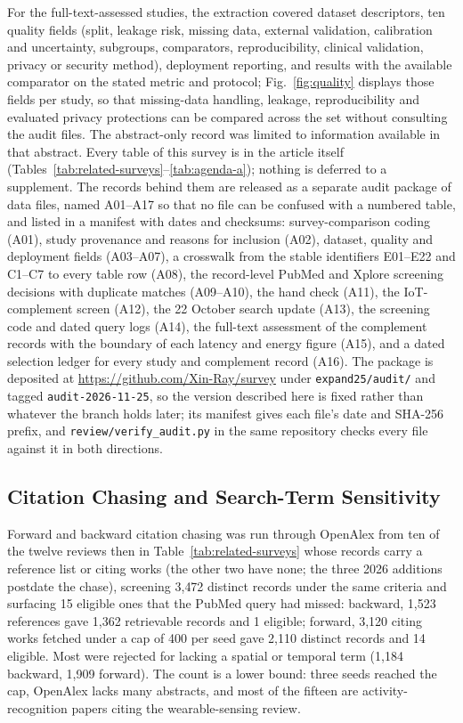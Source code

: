 \documentclass[journal]{IEEEtran}
\begin{document}
For the full-text-assessed studies, the extraction covered dataset descriptors, ten quality fields (split, leakage risk, missing data, external validation, calibration and uncertainty, subgroups, comparators, reproducibility, clinical validation, privacy or security method), deployment reporting, and results with the available comparator on the stated metric and protocol; Fig.~\ref{fig:quality} displays those fields per study, so that missing-data handling, leakage, reproducibility and evaluated privacy protections can be compared across the set without consulting the audit files. The abstract-only record was limited to information available in that abstract. Every table of this survey is in the article itself (Tables~\ref{tab:related-surveys}--\ref{tab:agenda-a}); nothing is deferred to a supplement. The records behind them are released as a separate audit package of data files, named A01--A17 so that no file can be confused with a numbered table, and listed in a manifest with dates and checksums: survey-comparison coding (A01), study provenance and reasons for inclusion (A02), dataset, quality and deployment fields (A03--A07), a crosswalk from the stable identifiers E01--E22 and C1--C7 to every table row (A08), the record-level PubMed and Xplore screening decisions with duplicate matches (A09--A10), the hand check (A11), the IoT-complement screen (A12), the 22 October search update (A13), the screening code and dated query logs (A14), the full-text assessment of the complement records with the boundary of each latency and energy figure (A15), and a dated selection ledger for every study and complement record (A16). The package is deposited at \url{https://github.com/Xin-Ray/survey} under \texttt{expand25/audit/} and tagged \texttt{audit-2026-11-25}, so the version described here is fixed rather than whatever the branch holds later; its manifest gives each file's date and SHA-256 prefix, and \texttt{review/verify\_audit.py} in the same repository checks every file against it in both directions.

\subsection{Citation Chasing and Search-Term Sensitivity}
\label{sec:chasing}
Forward and backward citation chasing was run through OpenAlex from ten of the twelve reviews then in Table~\ref{tab:related-surveys} whose records carry a reference list or citing works (the other two have none; the three 2026 additions postdate the chase), screening 3{,}472 distinct records under the same criteria and surfacing 15 eligible ones that the PubMed query had missed: backward, 1{,}523 references gave 1{,}362 retrievable records and 1 eligible; forward, 3{,}120 citing works fetched under a cap of 400 per seed gave 2{,}110 distinct records and 14 eligible. Most were rejected for lacking a spatial or temporal term (1{,}184 backward, 1{,}909 forward). The count is a lower bound: three seeds reached the cap, OpenAlex lacks many abstracts, and most of the fifteen are activity-recognition papers citing the wearable-sensing review.
\end{document}
